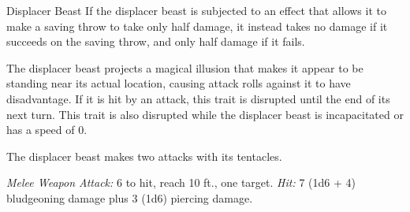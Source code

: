 \documentclass[10pt,a4paper,twoside,bg=print,twocolumn,openany,nodeprecatedcode]{dndbook}
\begin{document}
\begin{DndMonster}[float=t]{Displacer Beast}
\DndMonsterBasics[
armor-class = {13 (natural armor)},
hit-points = {\DndDice{10d10 + 30}},
speed = {40 ft.}
]
\DndMonsterAbilityScores[
 str = 18,
 dex = 15,
 con = 16,
 int = 6,
 wis = 12,
 cha = 8
]
\DndMonsterDetails[
senses = {darkvision 60 ft., passive perception 11},
challenge = 3,
]
If the displacer beast is subjected to an effect that allows it to make a saving throw to take only half damage, it instead takes no damage if it succeeds on the saving throw, and only half damage if it fails.

The displacer beast projects a magical illusion that makes it appear to be standing near its actual location, causing attack rolls against it to have disadvantage. If it is hit by an attack, this trait is disrupted until the end of its next turn. This trait is also disrupted while the displacer beast is incapacitated or has a speed of 0.

The displacer beast makes two attacks with its tentacles.

\textsl{Melee Weapon Attack:} 6 to hit, reach 10 ft., one target. \textsl{Hit:} 7 (1d6 + 4) bludgeoning damage plus 3 (1d6) piercing damage.

\end{DndMonster}
\end{document}
